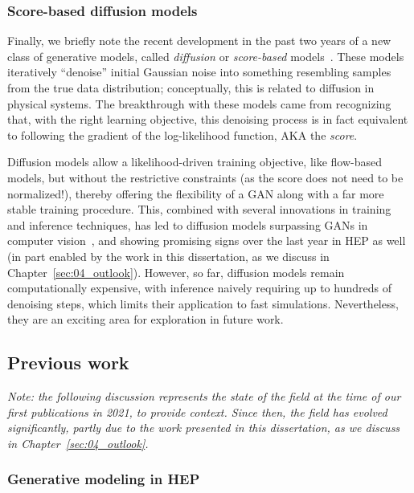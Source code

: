 \subsubsection{Score-based diffusion models}

Finally, we briefly note the recent development in the past two years of a new class of generative models, called \textit{diffusion} or \textit{score-based} models~\cite{ho2020denoising, song2021score}.
These models iteratively ``denoise'' initial Gaussian noise into something resembling samples from the true data distribution; conceptually, this is related to diffusion in physical systems.
The breakthrough with these models came from recognizing that, with the right learning objective, this denoising process is in fact equivalent to following the gradient of the log-likelihood function, AKA the \textit{score}.

Diffusion models allow a likelihood-driven training objective, like flow-based models, but without the restrictive constraints (as the score does not need to be normalized!), thereby offering the flexibility of a GAN along with a far more stable training procedure.
This, combined with several innovations in training and inference techniques, has led to diffusion models surpassing GANs in computer vision~\cite{dhariwal2021diffusion}, and showing promising signs over the last year in HEP as well (in part enabled by the work in this dissertation, as we discuss in Chapter~\ref{sec:04_outlook}).
However, so far, diffusion models remain computationally expensive, with inference naively requiring up to hundreds of denoising steps, which limits their application to fast simulations.
Nevertheless, they are an exciting area for exploration in future work.

\subsection{Previous work}
\label{sec:04_mpgan_genhep}

\textit{Note: the following discussion represents the state of the field at the time of our first publications in 2021, to provide context.
Since then, the field has evolved significantly, partly due to the work presented in this dissertation, as we discuss in Chapter~\ref{sec:04_outlook}. 
}

\subsubsection{Generative modeling in HEP}

